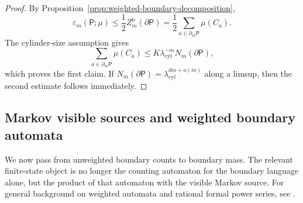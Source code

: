 \begin{proof}
By Proposition~\ref{prop:weighted-boundary-decomposition},
\[
  \varepsilon_m(\mathsf{P};\mu)
  \leq \frac12 Z_m^\mu(\partial\mathsf{P})
  = \frac12\sum_{a\in\partial_m\mathsf{P}}\mu(C_a).
\]
The cylinder-size assumption gives
\[
  \sum_{a\in\partial_m\mathsf{P}}\mu(C_a)
  \leq K\lambda_{\mathrm{cyl}}^{-m}N_m(\partial\mathsf{P}),
\]
which proves the first claim.  If
\(N_m(\partial\mathsf{P})
 = \lambda_{\mathrm{cyl}}^{dm+o(m)}\)
along a limsup, then the second estimate follows immediately.
\end{proof}

\subsection{Markov visible sources and weighted boundary automata}

We now pass from unweighted boundary counts to boundary mass.  The
relevant finite-state object is no longer the counting automaton for the
boundary language alone, but the product of that automaton with the
visible Markov source.  For general background on weighted automata and
rational formal power series, see \citet{Sakarovitch2009}.

